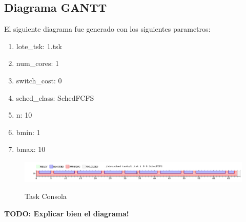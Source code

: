 \subsection{Diagrama GANTT}

El siguiente diagrama fue generado con los siguientes parametros:

\begin{enumerate}
	\item lote\_tsk: 1.tsk
	\item num\_cores: 1
	\item switch\_cost: 0
	\item sched\_class: SchedFCFS
	\item n: 10
	\item bmin: 1
	\item bmax: 10
\end{enumerate}

\begin{figure}[h]
    \includegraphics[width=\linewidth]{images/1.png}
    \label{fig:Task Consola}
    \caption{Task Consola}
\end{figure}

\textbf{TODO: Explicar bien el diagrama!}